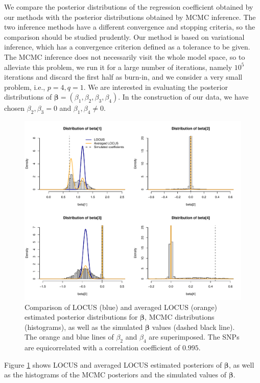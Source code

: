 \documentclass[a4paper, 11pt]{report}
\numberwithin{equation}{chapter}
\begin{document}
We compare the posterior distributions of the regression coefficient obtained by our methods with the posterior distributions obtained by MCMC inference. The two inference methods have a different convergence and stopping criteria, so the comparison should be studied prudently. Our method is based on variational inference, which has a convergence criterion defined as a tolerance to be given. The MCMC inference does not necessarily visit the whole model space, so to alleviate this problem, we run it for a large number of iterations, namely $10^5$ iterations and discard the first half as burn-in, and we consider a very small problem, i.e., $p=4, q=1$. We are interested in evaluating the posterior distributions of $\boldsymbol{\beta} = (\beta_1, \beta_2, \beta_3, \beta_4)$. In the construction of our data, we have chosen $\beta_2, \beta_3 = 0$ and $\beta_1, \beta_4 \neq 0$.
\begin{figure}[h]
\centering
\includegraphics[width=\textwidth, bb=0 0 9.8in 8.07in]{images/MCMC_noanneal.pdf}
\caption{\label{fig:no_ann}Comparison of LOCUS (blue) and averaged LOCUS (orange) estimated posterior distributions for $\boldsymbol{\beta}$, MCMC distributions (histograms), as well as the simulated $\boldsymbol{\beta}$ values (dashed black line). The orange and blue lines of $\beta_2$ and $\beta_4$ are superimposed. The SNPs are equicorrelated with a correlation coefficient of $0.995$.}
\end{figure}

Figure \ref{fig:no_ann} shows LOCUS and averaged LOCUS estimated posteriors of $\boldsymbol{\beta}$, as well as the histograms of the MCMC posteriors and the simulated values of $\boldsymbol{\beta}$. 
\end{document}
